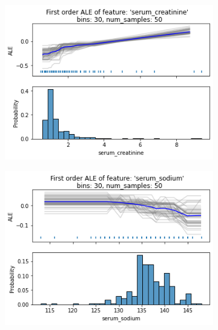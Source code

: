 \documentclass[11pt,
  a4paper,
  parskip=half, %
  BCOR=10mm, %
  english,
  ]{article}
\begin{document}
\begin{figure}[htp!]
    \begin{subfigure}[t]{.49\textwidth}
        \includegraphics[width=\linewidth]{images/ALE_serum_ceatinine.png}
        \caption{}
        \label{fig:ALE-2/serum-creatine}
    \end{subfigure}
    \hfill
    \begin{subfigure}[t]{.49\textwidth}
        \includegraphics[width=\linewidth]{images/ALE_serum_sodium.png}
        \caption{}
        \label{fig:ALE-2/serum-sodium}
    \end{subfigure} \\
    \begin{center}
        \begin{subfigure}[t]{.49\textwidth}

\end{subfigure}
\end{center}
\end{figure}
\end{document}
